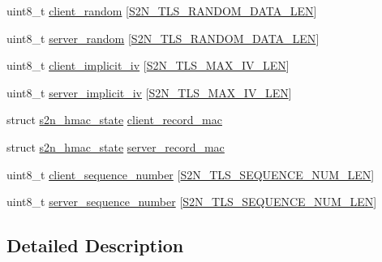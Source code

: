 \begin{DoxyCompactItemize}
\item 
uint8\+\_\+t \hyperlink{structs2n__crypto__parameters_a782eb75227ef443a21bfa5f2eb9d4b7a}{client\+\_\+random} \mbox{[}\hyperlink{tls_2s2n__crypto_8h_ae4f42b5fd74ab885893a960b81dbd57f}{S2\+N\+\_\+\+T\+L\+S\+\_\+\+R\+A\+N\+D\+O\+M\+\_\+\+D\+A\+T\+A\+\_\+\+L\+EN}\mbox{]}
\item 
uint8\+\_\+t \hyperlink{structs2n__crypto__parameters_ae6ef2eba6c9afbd8345314a05422a2e4}{server\+\_\+random} \mbox{[}\hyperlink{tls_2s2n__crypto_8h_ae4f42b5fd74ab885893a960b81dbd57f}{S2\+N\+\_\+\+T\+L\+S\+\_\+\+R\+A\+N\+D\+O\+M\+\_\+\+D\+A\+T\+A\+\_\+\+L\+EN}\mbox{]}
\item 
uint8\+\_\+t \hyperlink{structs2n__crypto__parameters_ac38c4c9618058e6ca7f9fef4c7ea6048}{client\+\_\+implicit\+\_\+iv} \mbox{[}\hyperlink{tls_2s2n__crypto_8h_a10384078d09bffcc7c0570926203dbfd}{S2\+N\+\_\+\+T\+L\+S\+\_\+\+M\+A\+X\+\_\+\+I\+V\+\_\+\+L\+EN}\mbox{]}
\item 
uint8\+\_\+t \hyperlink{structs2n__crypto__parameters_a6f73f56517df7d3ff20e29a89d24bbd0}{server\+\_\+implicit\+\_\+iv} \mbox{[}\hyperlink{tls_2s2n__crypto_8h_a10384078d09bffcc7c0570926203dbfd}{S2\+N\+\_\+\+T\+L\+S\+\_\+\+M\+A\+X\+\_\+\+I\+V\+\_\+\+L\+EN}\mbox{]}
\item 
struct \hyperlink{structs2n__hmac__state}{s2n\+\_\+hmac\+\_\+state} \hyperlink{structs2n__crypto__parameters_a9e84d70c1483dbddcb35a95aca818166}{client\+\_\+record\+\_\+mac}
\item 
struct \hyperlink{structs2n__hmac__state}{s2n\+\_\+hmac\+\_\+state} \hyperlink{structs2n__crypto__parameters_a2d6bba69a948270d25b1e24876225224}{server\+\_\+record\+\_\+mac}
\item 
uint8\+\_\+t \hyperlink{structs2n__crypto__parameters_ab7767b5b58441b15ac1028ac18b06ef1}{client\+\_\+sequence\+\_\+number} \mbox{[}\hyperlink{tls_2s2n__crypto_8h_ab6af529d3a237c0d8d2f67edcf831c25}{S2\+N\+\_\+\+T\+L\+S\+\_\+\+S\+E\+Q\+U\+E\+N\+C\+E\+\_\+\+N\+U\+M\+\_\+\+L\+EN}\mbox{]}
\item 
uint8\+\_\+t \hyperlink{structs2n__crypto__parameters_a286710aff413808336b2f294554c7e55}{server\+\_\+sequence\+\_\+number} \mbox{[}\hyperlink{tls_2s2n__crypto_8h_ab6af529d3a237c0d8d2f67edcf831c25}{S2\+N\+\_\+\+T\+L\+S\+\_\+\+S\+E\+Q\+U\+E\+N\+C\+E\+\_\+\+N\+U\+M\+\_\+\+L\+EN}\mbox{]}
\end{DoxyCompactItemize}


\subsection{Detailed Description}


